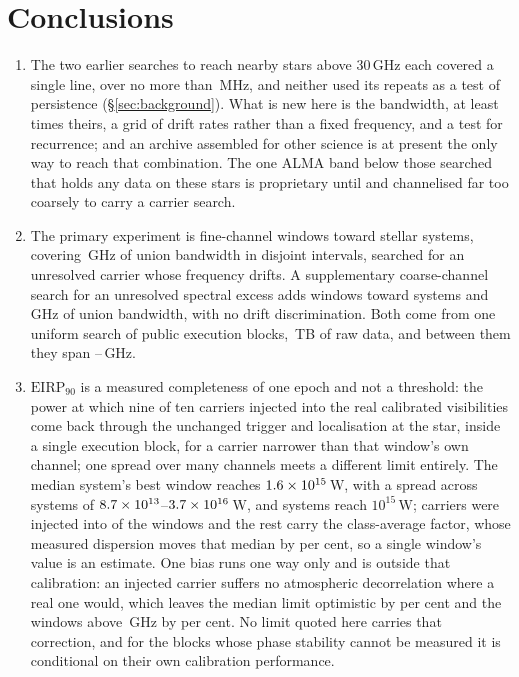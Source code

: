 \section{Conclusions}
\label{sec:conclusions}

\begin{enumerate}[leftmargin=1.6em,itemsep=4pt,topsep=4pt,parsep=0pt]

\item The two earlier searches to reach nearby stars above 30\,GHz each
covered a single line, over no more than \SbPriorBandMHz\,MHz, and neither
used its repeats as a test of persistence (\S\ref{sec:background}). What is
new here is the bandwidth, at least \SbPriorRatio{} times theirs, a grid of
drift rates rather than a fixed frequency, and a test for recurrence; and an
archive assembled for other science is at present the only way to reach that
combination. The one
ALMA band below those searched that holds any data on these stars is
proprietary until \SbBoneRelYear{} and channelised far too coarsely to carry
a carrier search.

\item The primary experiment is \NWinA{} fine-channel windows toward
\NSysClassA{} stellar systems, covering \CvUnionA\,GHz of union bandwidth in
\CovNIslands{} disjoint intervals, searched for an unresolved carrier whose
frequency drifts. A supplementary coarse-channel search for an unresolved spectral
excess adds \NWinB{} windows toward \PrSysClassB{} systems and
\CvUnionB\,GHz of union bandwidth, with no drift discrimination. Both come
from one uniform search of \NEB{} public execution blocks,
\TotalDataTB\,TB of raw data, and between them they span
\SurvFreqLo--\SurvFreqHi\,GHz.

\item $\mathrm{EIRP}_{90}$ is a measured completeness of one epoch and not a
threshold: the power at which nine of ten carriers
injected into the real calibrated visibilities come back through the
unchanged trigger and localisation at the star, inside a single execution
block, for a carrier narrower than that window's own channel; one spread over
many channels meets a different limit entirely. The median
system's best window reaches $1.6\times10^{15}$\,W, with a spread across
systems of $8.7\times10^{13}$--$3.7\times10^{16}$\,W, and
\NSysEfifteen{} systems reach $10^{15}$\,W; carriers were injected into
\SensNInj{} of the \NWinA{} windows and the rest carry the class-average
factor, whose measured dispersion moves that median by \ScRsMedShiftPct{} per
cent, so a single window's value is an estimate. One bias runs one way only
and is outside that calibration: an injected carrier suffers no atmospheric
decorrelation where a real one would, which leaves the median limit
optimistic by \SensDecorPct{} per cent and the windows above
\SensDecorHiGHz\,GHz by \SensDecorHiPct{} per cent. No limit quoted here
carries that correction, and for the \RpDecNUn{} blocks whose phase stability
cannot be measured it is conditional on their own calibration performance.


\end{enumerate}
